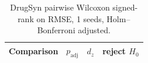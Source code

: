 \begin{table}[t]
\centering
\small
\caption{DrugSyn pairwise Wilcoxon signed-rank on RMSE, 1 seeds, Holm--Bonferroni adjusted.}
\label{tab:drugsyn_random_pw}
\begin{tabular}{lrrc}
\toprule
Comparison & $p_{\mathrm{adj}}$ & $d_z$ & reject $H_0$ \\
\midrule
\bottomrule
\end{tabular}
\end{table}
